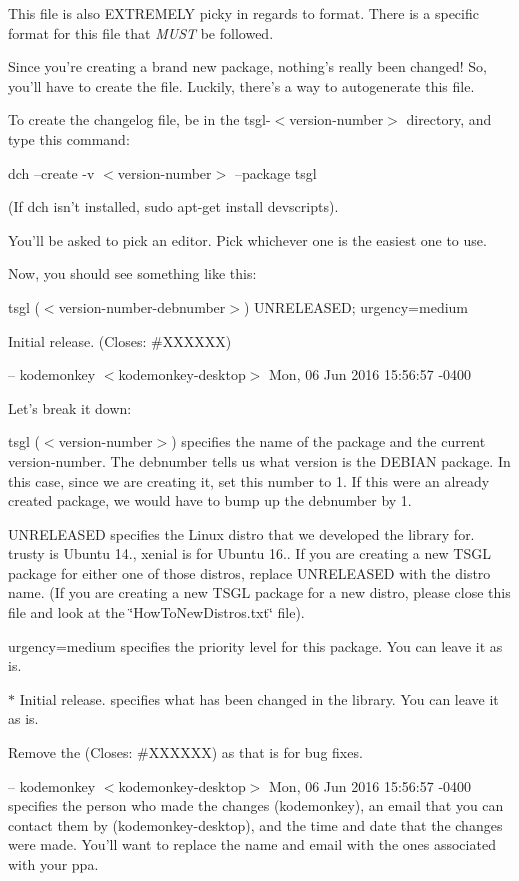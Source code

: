 This file is also E\-X\-T\-R\-E\-M\-E\-L\-Y picky in regards to format. There is a specific format for this file that {\itshape M\-U\-S\-T} be followed.

Since you're creating a brand new package, nothing's really been changed! So, you'll have to create the file. Luckily, there's a way to autogenerate this file.

To create the changelog file, be in the tsgl-\/$<$version-\/number$>$ directory, and type this command\-:

dch --create -\/v $<$version-\/number$>$ --package tsgl

(If dch isn't installed, sudo apt-\/get install devscripts).

You'll be asked to pick an editor. Pick whichever one is the easiest one to use.

Now, you should see something like this\-:

tsgl ($<$version-\/number-\/debnumber$>$) U\-N\-R\-E\-L\-E\-A\-S\-E\-D; urgency=medium


\begin{DoxyItemize}
\item Initial release. (Closes\-: \#\-X\-X\-X\-X\-X\-X)
\end{DoxyItemize}

-- kodemonkey $<$kodemonkey-\/desktop$>$ Mon, 06 Jun 2016 15\-:56\-:57 -\/0400

Let's break it down\-:


\begin{DoxyItemize}
\item tsgl ($<$version-\/number$>$) specifies the name of the package and the current version-\/number. The debnumber tells us what version is the D\-E\-B\-I\-A\-N package. In this case, since we are creating it, set this number to 1. If this were an already created package, we would have to bump up the debnumber by 1.
\item U\-N\-R\-E\-L\-E\-A\-S\-E\-D specifies the Linux distro that we developed the library for. trusty is Ubuntu 14., xenial is for Ubuntu 16.. If you are creating a new T\-S\-G\-L package for either one of those distros, replace U\-N\-R\-E\-L\-E\-A\-S\-E\-D with the distro name. (If you are creating a new T\-S\-G\-L package for a new distro, please close this file and look at the \char`\"{}\-How\-To\-New\-Distros.\-txt\char`\"{} file).
\item urgency=medium specifies the priority level for this package. You can leave it as is.
\item $\ast$ Initial release. specifies what has been changed in the library. You can leave it as is.
\item Remove the (Closes\-: \#\-X\-X\-X\-X\-X\-X) as that is for bug fixes.
\item -- kodemonkey $<$kodemonkey-\/desktop$>$ Mon, 06 Jun 2016 15\-:56\-:57 -\/0400 specifies the person who made the changes (kodemonkey), an email that you can contact them by (kodemonkey-\/desktop), and the time and date that the changes were made. You'll want to replace the name and email with the ones associated with your ppa.
\end{DoxyItemize}

